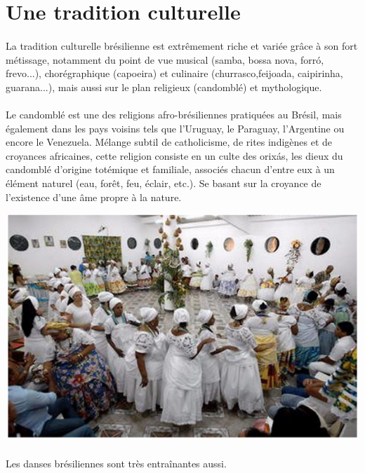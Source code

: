 \section{Une tradition culturelle}

\paragraph{} La tradition culturelle brésilienne est extrêmement riche et
variée grâce à son fort métissage, notamment du point de vue musical (samba,
bossa nova, forró, frevo...), chorégraphique (capoeira) et culinaire
(churrasco,feijoada, caipirinha, guarana...), mais aussi sur le plan religieux
(candomblé) et mythologique.

\paragraph{} Le candomblé est une des religions afro-brésiliennes pratiquées au
Brésil, mais également dans les pays voisins tels que l'Uruguay, le Paraguay,
l'Argentine ou encore le Venezuela. Mélange subtil de catholicisme, de rites
indigènes et de croyances africaines, cette religion consiste en un culte des
orixás, les dieux du candomblé d'origine totémique et familiale, associés
chacun d'entre eux à un élément naturel (eau, forêt, feu, éclair, etc.). Se
basant sur la croyance de l'existence d'une âme propre à la nature.

\begin{center}
	\includegraphics[scale=0.5]{bresil3.png}
\end{center}

\paragraph{} Les danses brésiliennes sont très entraînantes aussi.

